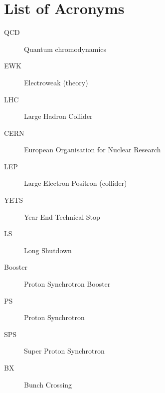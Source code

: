 \chapter{List of Acronyms}
\label{chap:IV-1-acronyms}

  \begin{description}

    \item[QCD]		    \dotfill	Quantum chromodynamics
    \item[EWK]		    \dotfill	Electroweak (theory)

    \item[LHC]		    \dotfill	Large Hadron Collider
    \item[CERN]       \dotfill	European Organisation for Nuclear Research
    \item[LEP]        \dotfill  Large Electron Positron (collider)
    \item[YETS]       \dotfill  Year End Technical Stop
    \item[LS]         \dotfill  Long Shutdown
    \item[Booster]    \dotfill  Proton Synchrotron Booster
    \item[PS]         \dotfill  Proton Synchrotron
    \item[SPS]        \dotfill  Super Proton Synchrotron
    \item[BX]         \dotfill  Bunch Crossing


\end{description}
